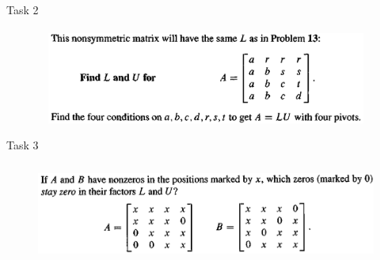\documentclass[aspectratio=169]{beamer}
\begin{document}
    \begin{frame}[t]{Task 2}
    \framesubtitle{}
    \begin{figure}[H]
        \centering\includegraphics[height=3cm,width=1\textwidth,keepaspectratio]{2.png}
        \label{fig:1.png}
    \end{figure}
    \end{frame}

    \begin{frame}[t]{Task 3}
    \framesubtitle{}
    \begin{figure}[H]
        \centering\includegraphics[height=3cm,width=1\textwidth,keepaspectratio]{3.png}
        \label{fig:1.png}
    \end{figure}
    \end{frame}
\end{document}
